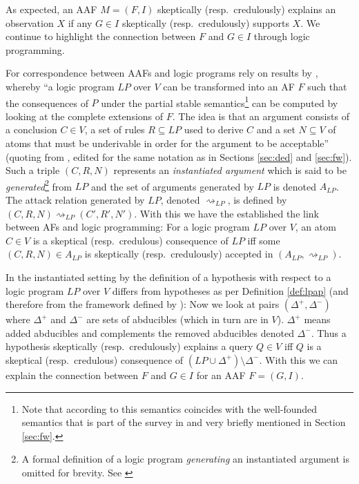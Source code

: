 \documentclass[a4paper]{article}
\newcommand{\attacks}{\rightsquigarrow}
\begin{document}
As expected, an AAF $M = ( F, I )$ skeptically (resp.~credulously) explains an observation $X$ if any $G \in I$ skeptically (resp.~credulously) supports $X$. We continue to highlight the connection between $F$ and $G \in I$ through logic programming.

For correspondence between AAFs and logic programs \citet{DBLP:conf/ecai/BoothGKRT14} rely on results by \citet{DBLP:journals/sLogica/WuCG09}, whereby \enquote{a logic program $LP$ over $V$ can be transformed into an AF $F$ such that the consequences of $P$ under the partial stable semantics\footnote{Note that according to \citet{DBLP:journals/fuin/Przymusinski90} this semantics coincides with the well-founded semantics that is part of the survey in \cite{DBLP:journals/tcs/EiterGL97} and very briefly mentioned in Section \ref{sec:fw}.} can be computed by looking at the complete extensions of $F$. The idea is that an argument consists of a conclusion $C \in V$, a set of rules $R \subseteq LP$ used to derive $C$ and a set $N \subseteq V$ of atoms that must be underivable in order for the argument to be acceptable} (quoting from \cite{DBLP:conf/ecai/BoothGKRT14}, edited for the same notation as in Sections \ref{sec:ded} and \ref{sec:fw}). Such a triple $(C, R, N)$ represents an \emph{instantiated argument} which is said to be \emph{generated}\footnote{A formal definition of a logic program \emph{generating} an instantiated argument is omitted for brevity. See \cite[Definition 13]{DBLP:conf/ecai/BoothGKRT14}} from $LP$ and the set of arguments generated by $LP$ is denoted $A_{LP}$. The attack relation generated by $LP$, denoted $\attacks_{LP}$, is defined by $(C, R, N) \attacks_{LP} (C', R', N')$. With this we have the established the link between AFs and logic programming: For a logic program $LP$ over $V$, an atom $C \in V$ is a skeptical (resp.~credulous) consequence of $LP$ iff some $(C, R, N) \in A_{LP}$ is skeptically (resp.~credulously) accepted in $(A_{LP}, \attacks_{LP})$.

In the instantiated setting by \citet{DBLP:conf/ecai/BoothGKRT14} the definition of a hypothesis with respect to a logic program $LP$ over $V$ differs from hypotheses as per Definition \ref{def:lpap} (and therefore from the framework defined by \citet{DBLP:journals/tcs/EiterGL97}): Now we look at pairs $(\Delta^+, \Delta^-)$ where $\Delta^+$ and $\Delta^-$ are sets of abducibles (which in turn are in $V$). $\Delta^+$ means added abducibles and complements the removed abducibles denoted $\Delta^-$. Thus a hypothesis skeptically (resp.~credulously) explains a query $Q \in V$ iff $Q$ is a skeptical (resp.~credulous) consequence of $(LP \cup \Delta^+) \setminus \Delta^-$. With this we can explain the connection between $F$ and $G \in I$ for an AAF $F = (G, I)$.
\end{document}
